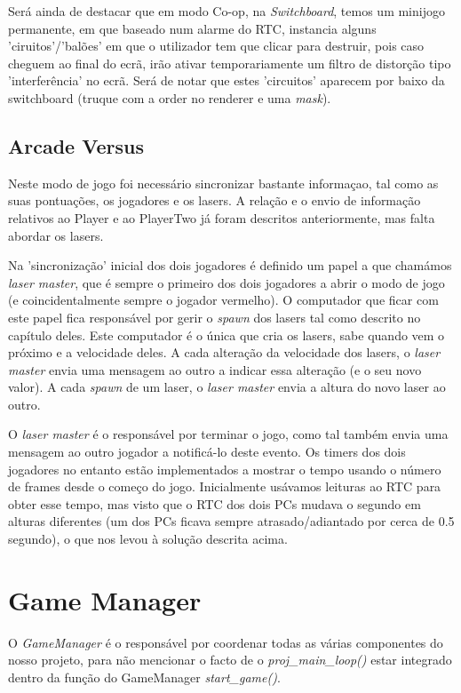 \documentclass{report}
\begin{document}
Será ainda de destacar que em modo Co-op, na \textit{Switchboard}, temos um minijogo permanente, em que baseado num alarme do RTC, instancia alguns 'ciruitos'/'balões' em que o utilizador tem que clicar para destruir, pois caso cheguem ao final do ecrã, irão ativar temporariamente um filtro de distorção tipo 'interferência' no ecrã. Será de notar que estes 'circuitos' aparecem por baixo da switchboard (truque com a order no renderer e uma \textit{mask}).

\subsection{Arcade Versus}

Neste modo de jogo foi necessário sincronizar bastante informaçao, tal como as suas pontuações, os jogadores e os lasers. A relação e o envio de informação relativos ao Player e ao PlayerTwo já foram descritos anteriormente, mas falta abordar os lasers.

Na 'sincronização' inicial dos dois jogadores é definido um papel a que chamámos \textit{laser master}, que é sempre o primeiro dos dois jogadores a abrir o modo de jogo (e coincidentalmente sempre o jogador vermelho). O computador que ficar com este papel fica responsável por gerir o \textit{spawn} dos lasers tal como descrito no capítulo deles. Este computador é o única que cria os lasers, sabe quando vem o próximo e a velocidade deles. A cada alteração da velocidade dos lasers, o \textit{laser master} envia uma mensagem ao outro a indicar essa alteração (e o seu novo valor). A cada \textit{spawn} de um laser, o \textit{laser master} envia a altura do novo laser ao outro.

O \textit{laser master} é o responsável por terminar o jogo, como tal também envia uma mensagem ao outro jogador a notificá-lo deste evento. Os timers dos dois jogadores no entanto estão implementados a mostrar o tempo usando o número de frames desde o começo do jogo. Inicialmente usávamos leituras ao RTC para obter esse tempo, mas visto que o RTC dos dois PCs mudava o segundo em alturas diferentes (um dos PCs ficava sempre atrasado/adiantado por cerca de 0.5 segundo), o que nos levou à solução descrita acima.

\section{Game Manager}

O \textit{GameManager} é o responsável por coordenar todas as várias componentes do nosso projeto, para não mencionar o facto de o \textit{proj\_main\_loop()} estar integrado dentro da função do GameManager \textit{start\_game()}.
\end{document}
